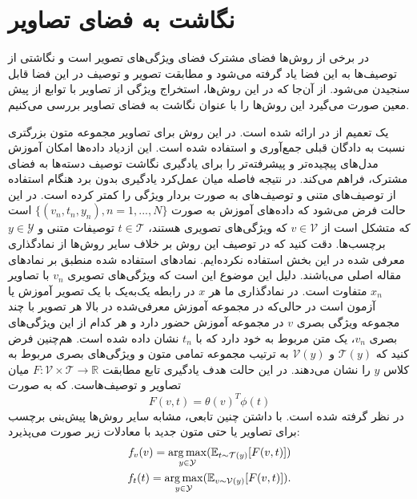 \section{نگاشت به فضای تصاویر}\label{to_images}
در برخی از روش‌ها فضای مشترک فضای ویژگی‌های تصویر است و نگاشتی از توصیف‌ها به این فضا یاد گرفته می‌شود و مطابقت تصویر و توصیف در این فضا قابل سنجیدن می‌شود. از آن‌جا که در این روش‌‌ها، استخراج ویژگی از تصاویر با توابع از پیش معین صورت می‌گیرد این روش‌ها را با عنوان نگاشت به فضای تصاویر بررسی می‌کنیم.


 یک تعمیم  از  در \cite{Reed2016} ارائه شده است. در این روش برای تصاویر مجموعه متون بزرگتری نسبت به دادگان قبلی 
 \cite{mohamed13}
  جمع‌آوری و استفاده شده است.
  این ازدیاد داده‌ها امکان آموزش مدل‌های پیچیده‌تر و پیشرفته‌تر را برای یادگیری نگاشت توصیف دسته‌ها به فضای مشترک، فراهم می‌کند. در نتیجه فاصله میان عمل‌کرد یادگیری بدون برد هنگام استفاده از
  توصیف‌های متنی و توصیف‌های به صورت بردار ویژگی را کمتر کرده است.
  در این حالت فرض می‌شود که داده‌های آموزش به صورت
   $\{(v_{n},t_{n},y_{n}), n = 1, ..., N\}$
   است که متشکل است از
    $v \in \mathcal{V}$
    که ویژگی‌های تصویری هستند،
     $t \in \mathcal{T}$ توصیفات متنی و $y \in \mathcal{Y}$ برچسب‌ها.
      دقت کنید که در توصیف این روش بر خلاف سایر روش‌ها از نمادگذاری معرفی شده در این بخش استفاده نکرده‌ایم.
      نمادهای استفاده شده منطبق بر نمادهای مقاله اصلی می‌باشند. دلیل این موضوع این است که ویژگی‌های تصویری $v_n$ با تصاویر  $x_n$ متفاوت است. در نمادگذاری ما هر $x$ در رابطه یک‌به‌یک با یک تصویر آموزش یا آزمون است در حالی‌که در مجموعه آموزش معرفی‌شده در بالا هر تصویر با چند مجموعه ویژگی بصری $v$ در مجموعه آموزش حضور دارد و هر کدام از این ويژگی‌های بصری $v_n$، یک متن مربوط به خود دارد که با $t_n$ نشان داده ‌شده است. هم‌چنین فرض کنید که  $\mathcal{T}(y)$ و $\mathcal{V}(y)$ به ترتیب مجموعه تمامی متون و ویژگی‌های بصری مربوط به کلاس $y$ را نشان می‌دهند.
  در این حالت هدف یادگیری تابع مطابقت $F : \mathcal{V} \times \mathcal{T} \rightarrow \mathbb{R}$ میان تصاویر و توصیف‌هاست. که به صورت
  \begin{equation}
  \label{eq:akata16comp}
F(v, t) = \theta(v)^T\phi(t)
  \end{equation}
در نظر گرفته شده است. با داشتن چنین تابعی، مشابه سایر روش‌ها پیش‌بنی برچسب برای تصاویر یا حتی متون جدید با معادلات زیر صورت می‌پذیرد:
\begin{align}
\label{eq:akata16class}
f_v(v) = \underset{y \in \mathcal{Y}}{\operatorname*{arg\,max}} ( \mathbb{ E}_{t \sim \mathcal{T}(y)}[F(v, t)])\\
f_t(t) = \underset{y \in \mathcal{Y}}{\operatorname*{arg\,max}} (\mathbb{ E}_{v \sim \mathcal{V}(y)}[F(v, t)]).
\end{align}
